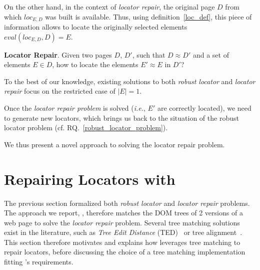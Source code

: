 On the other hand, in the context of \textit{locator repair}, the original page $D$ from which $loc_{E,D}$ was built is available.
Thus, using definition~\ref{loc_def}, this piece of information allows to locate the originally selected elements $eval(loc_{E,D}, D) = E$.

\begin{rqn}\label{locator_repair_problem}
    \textbf{Locator Repair}. 
    Given two pages $D$, $D'$, such that $D \approx D'$ and a set of elements $E\in D$, how to locate the elements $E' \approx E$ in $D'$?
\end{rqn}
To the best of our knowledge, existing solutions to both \emph{robust locator} and \emph{locator repair} focus on the restricted case of $|E| = 1$.

Once the \textit{locator repair problem} is solved (\emph{i.e.}, $E'$ are correctly located), we need to generate new locators, which brings us back to the situation of the robust locator problem (cf. RQ.~\ref{robust_locator_problem}).

We thus present a novel approach to solving the locator repair problem.


\section{Repairing Locators with \erratum}\label{erratum:sec:implementation}
The previous section formalized both \emph{robust locator} and \emph{locator repair} problems.
The approach we report, \erratum, therefore matches the DOM trees of 2 versions of a web page to solve the \emph{locator repair} problem.
Several tree matching solutions exist in the literature, such as \emph{Tree Edit Distance} (TED)~\cite{tai1979tree} or tree alignment~\cite{jiang1994alignment}.
This section therefore motivates and explains how \erratum leverages tree matching to repair locators, before discussing the choice of a tree matching implementation fitting \erratum's requirements.

